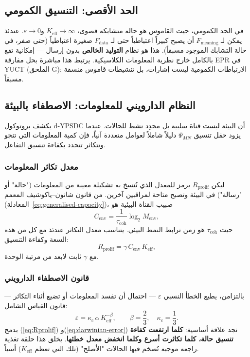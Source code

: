 \documentclass[12pt,a4paper]{article}
\newcommand{\Keff}{K_{\mathrm{eff}}}
\theoremstyle{remark}
\begin{document}
	\subsection{الحد الأقصى: التنسيق الكمومي}
	
	في الحد الكمومي، حيث القاموس هو حالة متشابكة قصوى، \(\Keff \to \infty\) و\(\varepsilon \to 0\). عندئذ يمكن لـ \(F_{\text{meaning}}\) أن يصبح كبيراً اعتباطياً حتى لـ \(F_{\text{data}}\) صغيرة اعتباطياً (حتى صفر، في حالة التشابك الموجود مسبقاً). هذا هو نظام \textbf{التوليد الخالص} بدون إرسال — إمكانية تقع بالكامل خارج نظرية المعلومات الكلاسيكية. يرتبط هذا مباشرة بحل مفارقة EPR في YUCT (الملحق G): الارتباطات الكمومية ليست إشارات، بل تنشيطات قاموس منسقة مسبقاً.
	
	\subsection{النظام الدارويني للمعلومات: الاصطفاء بالبيئة}
	\label{subsec:darwinian-regime}
	
	يكشف بروتوكول d‑YPSDC أن البيئة ليست قناة سلبية بل محدِد نشط للحالات. عندما يزود حقل تنسيق \(\Psi_{MN}\) دليلاً شاملاً لعوامل متعددة آنياً، فإن كمية المعلومات التي تنجو وتتكاثر تتحدد بكفاءة تنسيق التفاعل.
	
	\subsubsection*{معدل تكاثر المعلومات}
	ليكن \(R_{\mathrm{prolif}}\) يرمز للمعدل الذي تُنسخ به تشكيلة معينة من المعلومات ("حالة" أو "رسالة") في البيئة وتصبح متاحة لمراقبين آخرين. من قانون شانون–ياكوشيف المعمم (المعادلة~\ref{eq:generalised-capacity})، صبيب القناة البيئية هو
	\[
	C_{\mathrm{env}} = \frac{1}{\tau_{\mathrm{coh}}} \log_2 M_{\mathrm{env}},
	\]
	حيث \(\tau_{\mathrm{coh}}\) هو زمن ترابط النمط البيئي. يتناسب معدل التكاثر عندئذ مع كل من هذه السعة وكفاءة التنسيق:
	\begin{equation}
		R_{\mathrm{prolif}} = \gamma \, C_{\mathrm{env}} \, K_{\mathrm{eff}},
		\label{eq:Rprolif}
	\end{equation}
	مع \(\gamma\) ثابت لابعد من مرتبة الوحدة.
	
	\subsubsection*{قانون الاصطفاء الدارويني}
	بالتزامن، يطيع الخطأ النسبي \(\varepsilon\) — احتمال أن تفسد المعلومات أو تضيع أثناء التكاثر — قانون القياس الشامل:
	\begin{equation}
		\varepsilon = \kappa_c \, \alpha \, K_{\mathrm{eff}}^{-\beta},
		\qquad \beta = \frac{2}{3},\quad \kappa_c = \frac{1}{3}.
		\label{eq:darwinian-error}
	\end{equation}
	بدمج (\ref{eq:Rprolif}) و(\ref{eq:darwinian-error}) نجد علاقة أساسية: \textbf{كلما ارتفعت كفاءة تنسيق حالة، كلما تكاثرت أسرع وكلما انخفض معدل خطئها}. يخلق هذا حلقة تغذية راجعة موجبة تُضخم فيها الحالات "الأصلح" (تلك التي تعظم \(K_{\mathrm{eff}}\)) أسياً.
	
\end{document}
